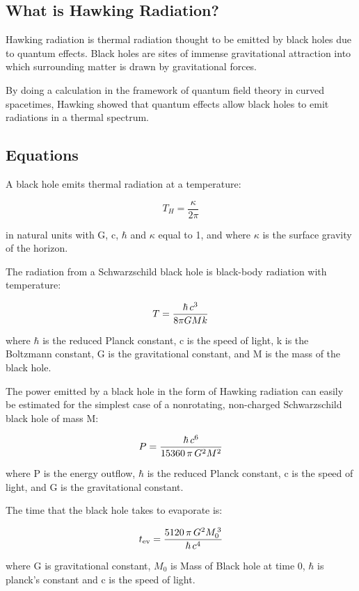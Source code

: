 \subsection{What is Hawking Radiation?}
{

Hawking radiation is thermal radiation thought to be emitted by black holes due to quantum effects. Black holes are sites of immense gravitational attraction into which surrounding matter is drawn by gravitational forces.


By doing a calculation in the framework of quantum field theory in curved spacetimes, Hawking showed that quantum effects allow black holes to emit radiations in a thermal spectrum.
}

\subsection{Equations}
{

A black hole emits thermal radiation at a temperature:

	\begin{equation}
	T_H = \frac{\kappa}{2 \pi}
	\end{equation}

in natural units with G, c, $\hbar$ and $\kappa$ equal to 1, and where $\kappa$ is the surface gravity of the horizon. \newline



The radiation from a Schwarzschild black hole is black-body radiation with temperature:

	\begin{equation}
	T={\hbar\,c^3\over8\pi G M k}
	\end{equation}

where $\hbar$ is the reduced Planck constant, c is the speed of light, k is the Boltzmann constant, G is the gravitational constant, and M is the mass of the black hole.
\newline



The power emitted by a black hole in the form of Hawking radiation can easily be estimated for the simplest case of a nonrotating, non-charged Schwarzschild black hole of mass M:

	\begin{equation}
	P={\hbar\,c^6\over15360\,\pi\,G^2M^2}
	\end{equation}

where P is the energy outflow, $\hbar$ is the reduced Planck constant, c is the speed of light, and G is the gravitational constant.
\newline



The time that the black hole takes to evaporate is:

	\begin{equation}
	t_{\operatorname{ev}}={5120\,\pi\,G^2M_0^{\,3}\over\hbar\,c^4}
	\end{equation}

where G is gravitational constant, $M_0$ is Mass of Black hole at time 0, $\hbar$ is planck's constant and c is the speed of light.
}
